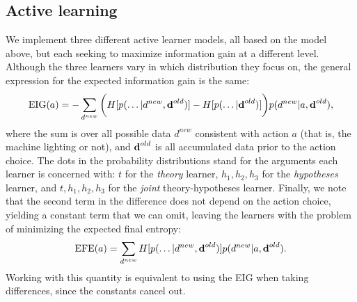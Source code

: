 \documentclass[11pt, a4paper]{article}
\begin{document}
\subsection*{Active learning}
We implement three different active learner models, all based on the model above, but each seeking to maximize information gain at a different level. Although the three learners vary in which distribution they focus on, the general expression for the expected information gain is the same:
\begin{equation}
\textrm{EIG}(a)=-\sum_{d^{new}} \bigg( H[p(\dots|d^{new},{\textbf d^{old}})]-H[p(\dots|{\textbf d^{old}})] \bigg) p(d^{new}| a, {\textbf d^{old}}),
\end{equation}
where the sum is over all possible data $d^{new}$ consistent with action $a$ (that is, the machine lighting or not), and $\textbf d^{old}$ is all accumulated data prior to the action choice. The dots in the probability distributions stand for the arguments each learner is concerned with: $t$ for the \emph{theory} learner, $h_1, h_2, h_3$ for the \emph{hypotheses} learner, and $t, h_1, h_2, h_3$ for the \emph{joint} theory-hypotheses learner. Finally, we note that the second term in the difference does not depend on the action choice, yielding a constant term that we can omit, leaving the learners with the problem of minimizing the expected final entropy:
\begin{equation}
\textrm{EFE}(a)=\sum_{d^{new}} H[p(\dots|d^{new},{\textbf d^{old}})] p(d^{new}| a, {\textbf d^{old}}).
\label{eig}
\end{equation}
Working with this quantity is equivalent to using the EIG when taking differences, since the constants cancel out.
\end{document}

